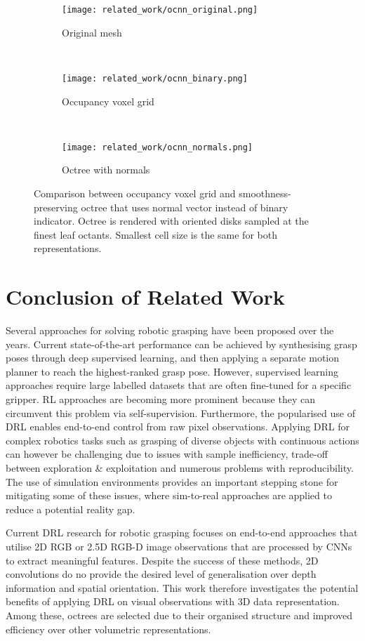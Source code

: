 \begin{figure}[ht]
    \centering
    \begin{subfigure}[ht]{0.325\textwidth}
        \centering
        \texttt{[image: related\_work/ocnn\_original.png]}
        \caption*{Original mesh}
    \end{subfigure}%
    ~
    \begin{subfigure}[ht]{0.325\textwidth}
        \centering
        \texttt{[image: related\_work/ocnn\_binary.png]}
        \caption*{Occupancy voxel grid}
    \end{subfigure}%
    ~
    \begin{subfigure}[ht]{0.325\textwidth}
        \centering
        \texttt{[image: related\_work/ocnn\_normals.png]}
        \caption*{Octree with normals}
    \end{subfigure}%
    \caption{Comparison between occupancy voxel grid and smoothness-preserving octree that uses normal vector instead of binary indicator. Octree is rendered with oriented disks sampled at the finest leaf octants. Smallest cell size is the same for both representations.~\protect\cite{wang_o-cnn_2017}}
    \label{fig:rw_ocnn_occupancy_vs_normals}
\end{figure}


\section*{Conclusion of Related Work}

Several approaches for solving robotic grasping have been proposed over the years. Current state-of-the-art performance can be achieved by synthesising grasp poses through deep supervised learning, and then applying a separate motion planner to reach the highest-ranked grasp pose. However, supervised learning approaches require large labelled datasets that are often fine-tuned for a specific gripper. RL approaches are becoming more prominent because they can circumvent this problem via self-supervision. Furthermore, the popularised use of DRL enables end-to-end control from raw pixel observations. Applying DRL for complex robotics tasks such as grasping of diverse objects with continuous actions can however be challenging due to issues with sample inefficiency, trade-off between exploration \& exploitation and numerous problems with reproducibility. The use of simulation environments provides an important stepping stone for mitigating some of these issues, where sim-to-real approaches are applied to reduce a potential reality gap.

Current DRL research for robotic grasping focuses on end-to-end approaches that utilise 2D RGB or 2.5D RGB-D image observations that are processed by CNNs to extract meaningful features. Despite the success of these methods, 2D convolutions do no provide the desired level of generalisation over depth information and spatial orientation. This work therefore investigates the potential benefits of applying DRL on visual observations with 3D data representation. Among these, octrees are selected due to their organised structure and improved efficiency over other volumetric representations.
